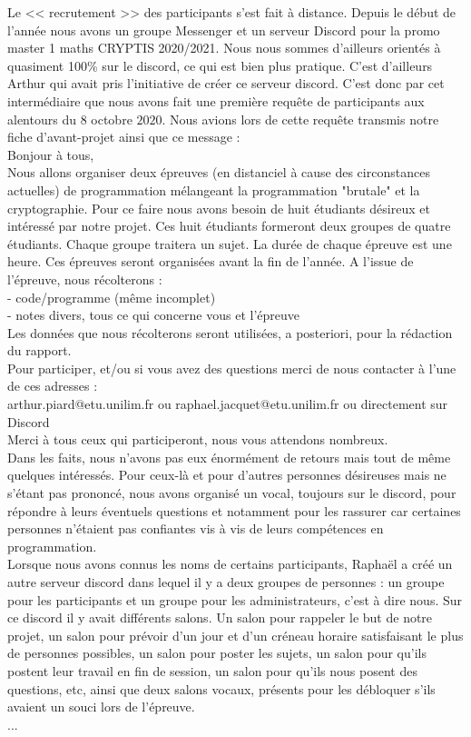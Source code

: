 \documentclass[12pt]{article}
\begin{document}
Le << recrutement >> des participants s'est fait à distance. Depuis le début de l'année nous avons un groupe Messenger et un serveur Discord pour la promo master 1 maths CRYPTIS 2020/2021. Nous nous sommes d'ailleurs orientés à quasiment  100\% sur le discord, ce qui est bien plus pratique. C'est d'ailleurs Arthur qui avait pris l'initiative de créer ce serveur discord. C'est donc par cet intermédiaire que nous avons fait une première requête de participants aux alentours du $8$ octobre $2020$. Nous avions lors de cette requête transmis notre fiche d'avant-projet ainsi que ce message :\\
Bonjour à tous,\\
Nous allons organiser deux épreuves (en distanciel à cause des circonstances actuelles) de programmation mélangeant la programmation "brutale" et la cryptographie. Pour ce faire nous avons besoin de huit étudiants désireux et intéressé par notre projet. Ces huit étudiants formeront deux groupes de quatre étudiants. Chaque groupe traitera un sujet. La durée de chaque épreuve est une heure. Ces épreuves seront organisées avant la fin de l'année. A l'issue de l'épreuve, nous récolterons : \\
- code/programme (même incomplet)\\
- notes divers, tous ce qui concerne vous et l'épreuve\\
Les données que nous récolterons seront utilisées, a posteriori, pour la rédaction du rapport.\\
Pour participer, et/ou si vous avez des questions merci de nous contacter à l'une de ces adresses :\\
arthur.piard@etu.unilim.fr ou raphael.jacquet@etu.unilim.fr
ou directement sur Discord\\
Merci à tous ceux qui participeront, nous vous attendons nombreux.
\vspace{24pt}\\
Dans les faits, nous n'avons pas eux énormément de retours mais tout de même quelques intéressés. Pour ceux-là et pour d'autres personnes désireuses mais ne s'étant pas prononcé, nous avons organisé un vocal, toujours sur le discord, pour répondre à leurs éventuels questions et notamment pour les rassurer car certaines personnes n'étaient pas confiantes vis à vis de leurs compétences en programmation.\\
Lorsque nous avons connus les noms de certains participants, Raphaël a créé un autre serveur discord dans lequel il y a deux groupes de personnes : un groupe pour les participants et un groupe pour les administrateurs, c'est à dire nous. Sur ce discord il y avait différents salons. Un salon pour rappeler le but de notre projet, un salon pour prévoir d'un jour et d'un créneau horaire satisfaisant le plus de personnes possibles, un salon pour poster les sujets, un salon pour qu'ils postent leur travail en fin de session, un salon pour qu'ils nous posent des questions, etc, ainsi que deux salons vocaux, présents pour les débloquer s'ils avaient un souci lors de l'épreuve.\\
...
\end{document}
